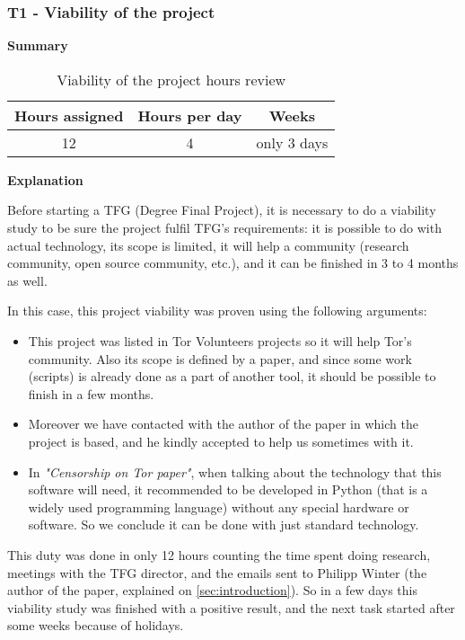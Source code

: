 \subsubsection{T1 - Viability of the project}
\label{sssec:viability}

\textbf{Summary}
\begin{table}[ht]
\centering
  \begin{tabular}{| c | c | c |}
  \hline Hours assigned & Hours per day & Weeks \\ \hline  
   12 & 4 & only 3 days        \\ \hline
  \end{tabular}
  \caption{Viability of the project hours review} \vspace{3pt}
  \label{tab:viability}
\end{table}

\textbf{Explanation}

Before starting a TFG (Degree Final Project), it is necessary to do a viability study to be sure the project fulfil TFG's requirements: it is possible to do with actual technology, its scope is limited, it will help a community (research community, open source community, etc.), and it can be finished in 3 to 4 months as well.

In this case, this project viability was proven using the following arguments:
\begin{itemize}
\item This project was listed in Tor Volunteers projects so it will help Tor's community. Also its scope is defined by a paper, and since some work (scripts) is already done as a part of another tool, it should be possible to finish in a few months.
\item Moreover we have contacted with the author of the paper in which the project is based, and he kindly accepted to help us sometimes with it.
\item In \textit{"Censorship on Tor paper"}, when talking about the technology that this software will need, it recommended to be developed in Python (that is a widely used programming language) without any special hardware or  software. So we conclude it can be done with just standard technology.
\end{itemize}

This duty was done in only 12 hours counting the time spent doing research, meetings with the TFG director, and the emails sent to Philipp Winter (the author of the paper, explained on \ref{sec:introduction}).
So in a few days this viability study was finished with a positive result, and the next task started after some weeks because of holidays.